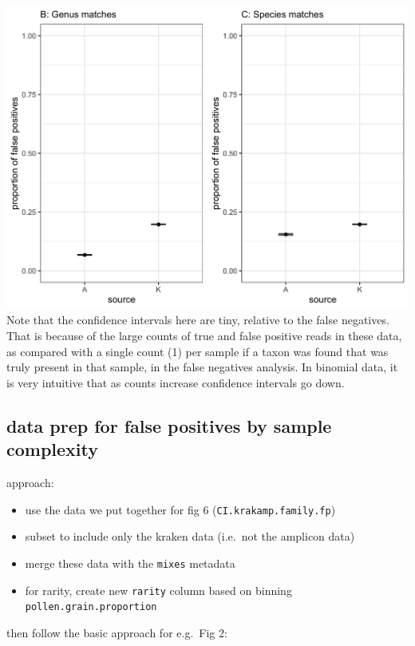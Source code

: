 \documentclass[
]{article}
\providecommand{\tightlist}{%
  \setlength{\itemsep}{0pt}\setlength{\parskip}{0pt}}
\begin{document}
\includegraphics{fig6_combined.jpg} Note that the confidence intervals
here are tiny, relative to the false negatives. That is because of the
large counts of true and false positive reads in these data, as compared
with a single count (1) per sample if a taxon was found that was truly
present in that sample, in the false negatives analysis. In binomial
data, it is very intuitive that as counts increase confidence intervals
go down.

\hypertarget{data-prep-for-false-positives-by-sample-complexity}{%
\subsection{data prep for false positives by sample
complexity}\label{data-prep-for-false-positives-by-sample-complexity}}

approach:

\begin{itemize}
\tightlist
\item
  use the data we put together for fig 6 (\texttt{CI.krakamp.family.fp})
\item
  subset to include only the kraken data (i.e.~not the amplicon data)
\item
  merge these data with the \texttt{mixes} metadata
\item
  for rarity, create new \texttt{rarity} column based on binning
  \texttt{pollen.grain.proportion}
\end{itemize}

then follow the basic approach for e.g.~Fig 2:
\end{document}
